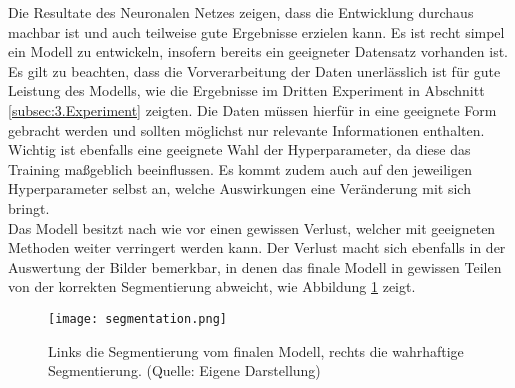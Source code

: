 Die Resultate des Neuronalen Netzes zeigen, dass die Entwicklung durchaus machbar ist und auch teilweise gute Ergebnisse erzielen kann. Es ist recht simpel ein Modell zu entwickeln, insofern bereits ein geeigneter Datensatz vorhanden ist. \\
Es gilt zu beachten, dass die Vorverarbeitung der Daten unerlässlich ist für gute Leistung des Modells, wie die Ergebnisse im Dritten Experiment in Abschnitt \ref{subsec:3.Experiment} zeigten. Die Daten müssen hierfür in eine geeignete Form gebracht werden und sollten möglichst nur relevante Informationen enthalten. Wichtig ist ebenfalls eine geeignete Wahl der Hyperparameter, da diese das Training maßgeblich beeinflussen. Es kommt zudem auch auf den jeweiligen Hyperparameter selbst an, welche Auswirkungen eine Veränderung mit sich bringt.\\
Das Modell besitzt nach wie vor einen gewissen Verlust, welcher mit geeigneten Methoden weiter verringert werden kann. Der Verlust macht sich ebenfalls in der Auswertung der Bilder bemerkbar, in denen das finale Modell in gewissen Teilen von der korrekten Segmentierung abweicht, wie Abbildung \ref{fig:segmentation} zeigt.


\begin{figure}
	\centering
	\texttt{[image: segmentation.png]}
	\caption{Links die Segmentierung vom finalen Modell, rechts die wahrhaftige Segmentierung. (Quelle: Eigene Darstellung)}
	\label{fig:segmentation}
\end{figure}